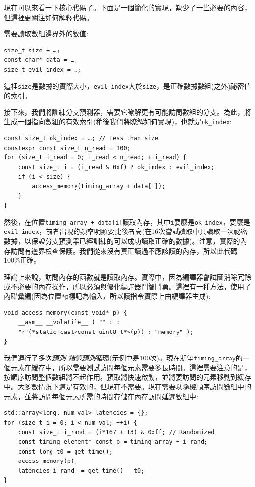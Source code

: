 現在可以來看一下核心代碼了。下面是一個簡化的實現，缺少了一些必要的內容，但這裡更關注如何解釋代碼。

需要讀取數組邊界外的數值:

\begin{lstlisting}[style=styleCXX]
size_t size = …;
const char* data = …;
size_t evil_index = …;
\end{lstlisting}

這裡\texttt{size}是數據的實際大小，\texttt{evil\_index}大於\texttt{size}，是正確數據數組(之外)祕密值的索引。

接下來，我們將訓練分支預測器，需要它瞭解更有可能訪問數組的分支。為此，將生成一個指向數組的有效索引(稍後我們將瞭解如何實現)，也就是\texttt{ok\_index}:

\begin{lstlisting}[style=styleCXX]
const size_t ok_index = …; // Less than size
constexpr const size_t n_read = 100;
for (size_t i_read = 0; i_read < n_read; ++i_read) {
	const size_t i = (i_read & 0xf) ? ok_index : evil_index;
	if (i < size) {
		access_memory(timing_array + data[i]);
	}
}
\end{lstlisting}

然後，在位置\texttt{timing\_array + data[i]}讀取內存，其中\texttt{i}要麼是\texttt{ok\_index}，要麼是\texttt{evil\_index}，前者出現的頻率明顯要比後者高(在16次嘗試讀取中只讀取一次祕密數據，以保證分支預測器已經訓練的可以成功讀取正確的數據)。注意，實際的內存訪問有邊界檢查保護。我們從來沒有真正讀過不應該讀的內存，所以此代碼100\%正確。

理論上來說，訪問內存的函數就是讀取內存。實際中，因為編譯器會試圖消除冗餘或不必要的內存操作，所以必須與優化編譯器鬥智鬥勇。這裡有一種方法，使用了內聯彙編(因為位置\texttt{*p}標記為輸入，所以讀指令實際上由編譯器生成):

\begin{lstlisting}[style=styleCXX]
void access_memory(const void* p) {
	__asm__ __volatile__ ( "" : :
	"r"(*static_cast<const uint8_t*>(p)) : "memory" );
}
\end{lstlisting}

我們運行了多次\textit{預測-錯誤預測}循環(示例中是100次)。現在期望\texttt{timing\_array}的一個元素在緩存中，所以需要測試訪問每個元素需要多長時間。這裡需要注意的是，按順序訪問整個數組將不起作用。預取將快速啟動，並將要訪問的元素移動到緩存中。大多數情況下這是有效的，但現在不需要。現在需要以隨機順序訪問數組中的元素，並將訪問每個元素所需的時間存儲在內存訪問延遲數組中:

\begin{lstlisting}[style=styleCXX]
std::array<long, num_val> latencies = {};
for (size_t i = 0; i < num_val; ++i) {
	const size_t i_rand = (i*167 + 13) & 0xff; // Randomized
	const timing_element* const p = timing_array + i_rand;
	const long t0 = get_time();
	access_memory(p);
	latencies[i_rand] = get_time() - t0;
}
\end{lstlisting}

